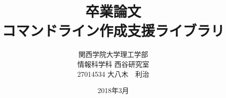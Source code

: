 \title{卒業論文\\コマンドライン作成支援ライブラリ}
\author{関西学院大学理工学部\\情報科学科 西谷研究室\\27014534 大八木　利治}
\date{2018年3月}

\maketitle
\newpage
